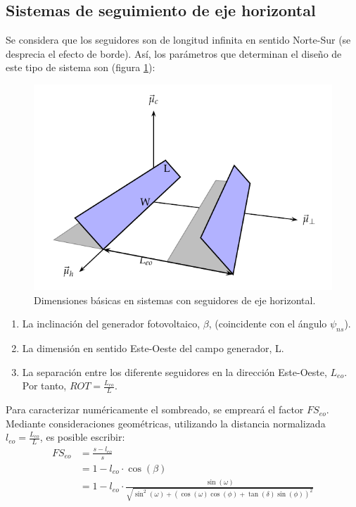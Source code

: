 \subsection{Sistemas de seguimiento de eje horizontal}
\label{sec:org00ae527}
Se considera que los seguidores son de longitud infinita en sentido Norte-Sur (se desprecia el efecto de borde). Así, los parámetros que determinan el diseño de este tipo de sistema son (figura \ref{fig:SeguidorEjeHorizontalSombras}):
\begin{figure}[htbp]
\centering
\includegraphics[scale=0.9]{figuras/SombrasHoriz.pdf}
\caption{Dimensiones básicas en sistemas con seguidores de eje horizontal. \label{fig:SeguidorEjeHorizontalSombras}}
\end{figure}
\begin{enumerate}
\item La inclinación del generador fotovoltaico, \(\beta\), (coincidente con el ángulo \(\psi_{ns}\)).
\item La dimensión en sentido Este-Oeste del campo generador, L.
\item La separación entre los diferente seguidores en la dirección Este-Oeste, \(L_{eo}\).
Por tanto, \(ROT=\frac{L_{eo}}{L}\).
\end{enumerate}

Para caracterizar numéricamente el sombreado, se empreará el factor \(FS_{eo}\). Mediante consideraciones geométricas, utilizando la distancia normalizada \(l_{eo}=\frac{L_{eo}}{L}\), es posible escribir:
\begin{align}
FS_{eo} & =\frac{s-l_{eo}}{s}\nonumber \\
 & =1-l_{eo}\cdot\cos(\beta)\nonumber \\
 &
 =1-l_{eo}\cdot\frac{\sin(\omega)}{\sqrt{\sin^{2}(\omega)+\left(\cos(\omega)\cos(\phi)+\tan(\delta)\sin(\phi)\right)^{2}}}\label{eq:FSeoHorizontal}
\end{align}

